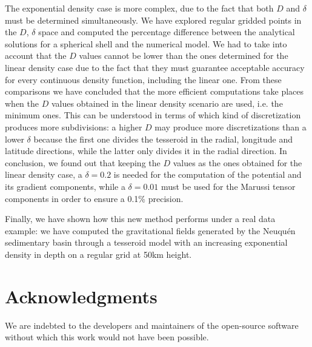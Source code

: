 \documentclass[extra]{gji}
\begin{document}
The exponential density case is more complex, due to the fact that both $D$ 
and $\delta$ must be determined simultaneously.
We have explored regular gridded points in the $D$, $\delta$ space and 
computed the percentage difference between the analytical solutions for a 
spherical shell and the numerical model.
We had to take into account that the $D$ values cannot be lower than the ones 
determined for the linear density case due to the fact that they must 
guarantee acceptable accuracy for every continuous density function, including 
the linear one.
From these comparisons we have concluded that the more efficient computations 
take places when the $D$ values obtained in the linear density scenario are 
used, i.e. the minimum ones.
This can be understood in terms of which kind of discretization produces more 
subdivisions: a higher $D$ may produce more discretizations than a lower 
$\delta$ because the first one divides the tesseroid in the radial, longitude 
and latitude directions, while the latter only divides it in the radial 
direction.
In conclusion, we found out that keeping the $D$ values as the ones obtained 
for the linear density case, a $\delta = 0.2$ is needed for the computation of 
the potential and its gradient components, while a $\delta = 0.01$ must be 
used for the Marussi tensor components in order to ensure a 0.1\% precision.

Finally, we have shown how this new method performs under a real data example: 
we have computed the gravitational fields generated by the Neuqu\'en 
sedimentary basin through a tesseroid model with an increasing exponential 
density in depth on a regular grid at 50km height.



\section{Acknowledgments}

We are indebted to the developers and maintainers of the open-source
software without which this work would not have been possible.




\end{document}

